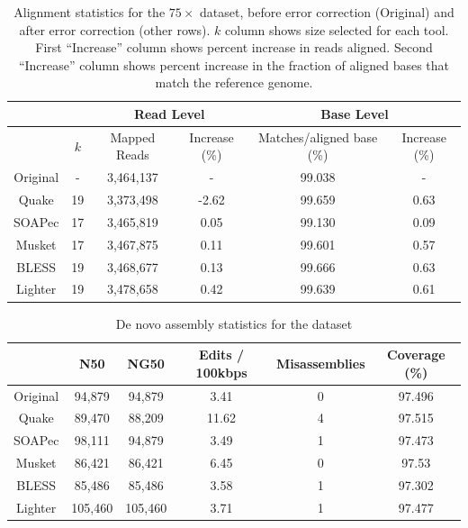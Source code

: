 \documentclass{bmcart}
\begin{document}
\begin{backmatter}
\begin{table}[h!] %
\caption{Alignment statistics for the $75\times$ \ecoli dataset, before error correction (Original) and after error correction (other rows).  $k$ column shows \kmer size selected for each tool.  First ``Increase'' column shows percent increase in reads aligned.  Second ``Increase'' column shows percent increase in the fraction of aligned bases that match the reference genome.}
\begin{tabular}{|c|c|c|c||c|c|} \hline
	 & & \multicolumn{2}{|c||}{Read Level} & \multicolumn{2}{|c|}{Base Level} \\ \hline
     & $k$ & Mapped Reads & Increase (\%) & Matches/aligned base (\%) & Increase (\%) \\ \hline
Original & - & 	3,464,137	 & - &  99.038 & - \\ \hline
Quake	& 19 & 3,373,498	& -2.62	& 99.659  & 0.63 \\ \hline
SOAPec  & 17 & 3,465,819 & 0.05 & 99.130 & 0.09 \\ \hline
Musket	& 17 & 3,467,875	& 0.11	& 99.601 & 0.57 \\ \hline
BLESS	& 19 & 3,468,677& 0.13	& 99.666  & 0.63 \\ \hline
Lighter	& 19 &  3,478,658	& 0.42	& 99.639  & 0.61 \\ \hline
\end{tabular}
\end{table}

\begin{table}[h!] %
\caption{De novo assembly statistics for the \ecoli dataset}
\begin{tabular}{|c|c|c|c|c|c|} \hline
	 	& N50 &	NG50	 & Edits / 100kbps&	Misassemblies	& Coverage (\%) \\ \hline
Original &	94,879 &	94,879	& 3.41	& 0	& 97.496  \\ \hline
Quake	& 89,470 &	88,209	& 11.62	& 4	 & 97.515  \\ \hline
SOAPec	& 98,111 &	94,879	& 3.49	& 1	& 97.473	\\ \hline
Musket	& 86,421  &	86,421	& 6.45	& 0	 & 97.53 \\ \hline
BLESS	& 85,486  &	85,486	& 3.58	& 1	& 97.302  \\ \hline
Lighter	& 105,460 &	105,460	& 3.71	& 1	& 97.477  \\ \hline
\end{tabular}
\end{table}



\end{backmatter}
\end{document}
